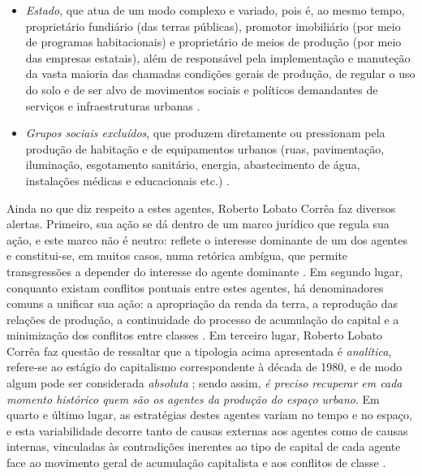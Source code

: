 \begin{itemize}
\item \textit{Estado}, que atua de um modo complexo e variado, pois é, ao mesmo tempo, proprietário fundiário (das terras públicas), promotor imobiliário (por meio de programas habitacionais) e proprietário de meios de produção (por meio das empresas estatais), além de responsável pela implementação e manuteção da vasta maioria das chamadas condições gerais de produção, de regular o uso do solo e de ser alvo de movimentos sociais e políticos demandantes de serviços e infraestruturas urbanas \cite[p.~24-29]{CORREA1985espa}.
\item \textit{Grupos sociais excluídos}, que produzem diretamente ou pressionam pela produção de habitação e de equipamentos urbanos (ruas, pavimentação, iluminação, esgotamento sanitário, energia, abastecimento de água, instalações médicas e educacionais etc.) \cite[p.~29-31]{CORREA1985espa}.
\end{itemize}

Ainda no que diz respeito a estes agentes, Roberto Lobato Corrêa faz diversos alertas. Primeiro, sua ação se dá dentro de um marco jurídico que regula sua ação, e este marco não é neutro: reflete o interesse dominante de um dos agentes e constitui-se, em muitos casos, numa retórica ambígua, que permite transgressões a depender do interesse do agente dominante \cite[p.~12]{CORREA1985espa}. Em segundo lugar, conquanto existam conflitos pontuais entre estes agentes, há denominadores comuns a unificar sua ação: a apropriação da renda da terra, a reprodução das relações de produção, a continuidade do processo de acumulação do capital e a minimização dos conflitos entre classes \cite[p.~12]{CORREA1985espa}. Em terceiro lugar, Roberto Lobato Corrêa faz questão de ressaltar que a tipologia acima apresentada é \textit{analítica}, refere-se ao estágio do capitalismo correspondente à década de 1980, e de modo algum pode ser considerada \textit{absoluta} \cite[p.~13]{CORREA1985espa}; sendo assim, \textit{é preciso recuperar em cada momento histórico quem são os agentes da produção do espaço urbano}. Em quarto e último lugar, as estratégias destes agentes variam no tempo e no espaço, e esta variabilidade decorre tanto de causas externas aos agentes como de causas internas, vinculadas às contradições inerentes ao tipo de capital de cada agente face ao movimento geral de acumulação capitalista e aos conflitos de classe \cite[p.~13]{CORREA1985espa}.

